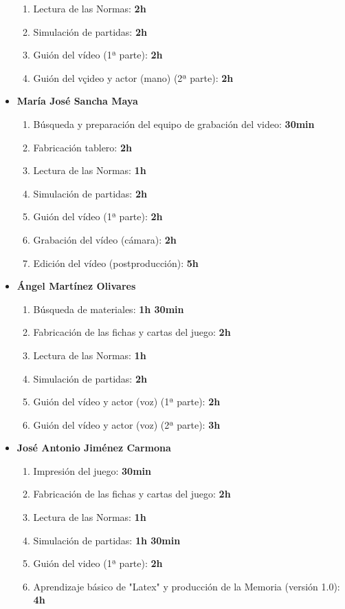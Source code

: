 \documentclass[11 pt]{book}
\begin{document}
\begin{itemize}
				    \begin{enumerate}
					    \item Lectura de las Normas: \textbf{2h}
					    \item Simulación de partidas: \textbf{2h}
					    \item Guión del vídeo (1ª parte): \textbf{2h}
					    \item Guión del vçideo y actor (mano) (2ª parte): \textbf{2h}
				    \end{enumerate}
			    \item \textbf {María José Sancha Maya}
				    \begin{enumerate}
					    \item Búsqueda y preparación del equipo de grabación del video: \textbf{30min}
					    \item Fabricación tablero: \textbf{2h}
					    \item Lectura de las Normas: \textbf{1h}
					    \item Simulación de partidas: \textbf{2h}
					    \item Guión del vídeo (1ª parte): \textbf{2h}
					    \item Grabación del vídeo (cámara): \textbf{2h}
					    \item Edición del vídeo (postproducción): \textbf{5h}
				    \end{enumerate}
			    \item \textbf {Ángel Martínez Olivares}
				    \begin{enumerate}
					    \item Búsqueda de materiales: \textbf{1h 30min}
					    \item Fabricación de las fichas y cartas del juego: \textbf{2h}
					    \item Lectura de las Normas: \textbf{1h}
					    \item Simulación de partidas: \textbf{2h}
					    \item Guión del vídeo y actor (voz) (1ª parte): \textbf{2h}
					    \item Guión del vídeo y actor (voz) (2ª parte): \textbf{3h}
				    \end{enumerate}
			    \item \textbf {José Antonio Jiménez Carmona}
				    \begin{enumerate}
					    \item Impresión del juego: \textbf{30min}
					    \item Fabricación de las fichas y cartas del juego: \textbf{2h}
					    \item Lectura de las Normas: \textbf{1h}
					    \item Simulación de partidas: \textbf{1h 30min}
					    \item Guión del video (1ª parte): \textbf{2h}
					    \item Aprendizaje básico de "Latex" y producción de la Memoria (versión 1.0): \textbf{4h}
				    \end{enumerate}
		    \end{itemize}
		    
\end{document}
